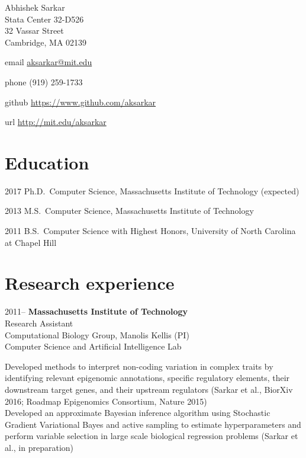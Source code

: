 \documentclass{article}
\begin{document}
{\LARGE Abhishek Sarkar\vspace{1em}}\\
Stata Center 32-D526\\
32 Vassar Street\\
Cambridge, MA 02139\vspace{1em}

\begin{hdesc}
\item[email] \url{aksarkar@mit.edu}
\item[phone] (919) 259-1733
\item[github] \url{https://www.github.com/aksarkar}
\item[url] \url{http://mit.edu/aksarkar}
\end{hdesc}

\section*{Education}
\begin{hdesc}
\item[2017] Ph.D.\ Computer Science, Massachusetts Institute of Technology
  (expected)
\item[2013] M.S.\ Computer Science, Massachusetts Institute of Technology
\item[2011] B.S.\ Computer Science with Highest Honors, University of North
  Carolina at Chapel Hill
\end{hdesc}

\section*{Research experience}
\begin{hdesc}[itemsep=1em]
\item[2011--] \textbf{Massachusetts Institute of Technology}\\
Research Assistant\\
Computational Biology Group, Manolis Kellis (PI)\\
Computer Science and Artificial Intelligence Lab
\end{hdesc}

Developed methods to interpret non-coding variation in complex traits by
identifying relevant epigenomic annotations, specific regulatory elements,
their downstream target genes, and their upstream regulators (Sarkar et al.,
BiorXiv 2016; Roadmap Epigenomics Consortium, Nature 2015)\\

Developed an approximate Bayesian inference algorithm using Stochastic
Gradient Variational Bayes and active sampling to estimate hyperparameters
and perform variable selection in large scale biological regression problems
(Sarkar et al., in preparation)\\
\end{document}
